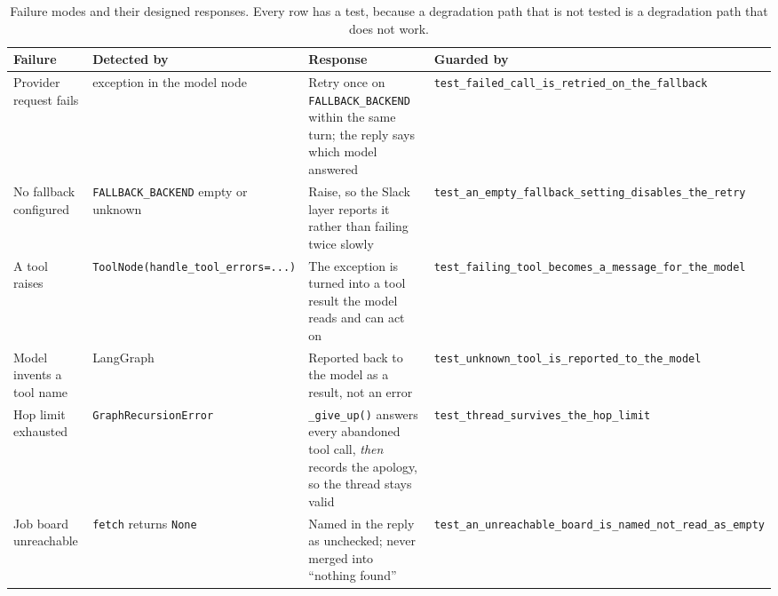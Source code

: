 \documentclass[11pt,a4paper]{article}
\newcommand{\tablefont}{\footnotesize}
\begin{document}
\begin{table}[!ht]
\centering\tablefont
\caption{Failure modes and their designed responses. Every row has a test, because a
degradation path that is not tested is a degradation path that does not work.}
\label{tab:failures}
\begin{tabularx}{\textwidth}{L{3.1cm} L{2.9cm} X L{3.4cm}}
\toprule
\textbf{Failure} & \textbf{Detected by} & \textbf{Response} & \textbf{Guarded by} \\
\midrule
Provider request fails & exception in the model node & Retry once on
  \texttt{FALLBACK\_\allowbreak{}BACKEND} within the same turn; the reply says which model answered &
  \texttt{test\_\allowbreak{}failed\_\allowbreak{}call\_\allowbreak{}is\_\allowbreak{}retried\_\allowbreak{}on\_\allowbreak{}the\_\allowbreak{}fallback} \\
No fallback configured & \texttt{FALLBACK\_\allowbreak{}BACKEND} empty or unknown & Raise, so the Slack
  layer reports it rather than failing twice slowly &
  \texttt{test\_\allowbreak{}an\_\allowbreak{}empty\_\allowbreak{}fallback\_\allowbreak{}setting\_\allowbreak{}disables\_\allowbreak{}the\_\allowbreak{}retry} \\
A tool raises & \texttt{ToolNode(handle\_\allowbreak{}tool\_\allowbreak{}errors=...)} & The exception is turned into a
  tool result the model reads and can act on &
  \texttt{test\_\allowbreak{}failing\_\allowbreak{}tool\_\allowbreak{}becomes\_\allowbreak{}a\_\allowbreak{}message\_\allowbreak{}for\_\allowbreak{}the\_\allowbreak{}model} \\
Model invents a tool name & LangGraph & Reported back to the model as a result, not an error &
  \texttt{test\_\allowbreak{}unknown\_\allowbreak{}tool\_\allowbreak{}is\_\allowbreak{}reported\_\allowbreak{}to\_\allowbreak{}the\_\allowbreak{}model} \\
Hop limit exhausted & \texttt{GraphRecursionError} & \texttt{\_\allowbreak{}give\_\allowbreak{}up()} answers every
  abandoned tool call, \emph{then} records the apology, so the thread stays valid &
  \texttt{test\_\allowbreak{}thread\_\allowbreak{}survives\_\allowbreak{}the\_\allowbreak{}hop\_\allowbreak{}limit} \\
Job board unreachable & \texttt{fetch} returns \texttt{None} & Named in the reply as
  unchecked; never merged into ``nothing found'' &
  \texttt{test\_\allowbreak{}an\_\allowbreak{}unreachable\_\allowbreak{}board\_\allowbreak{}is\_\allowbreak{}named\_\allowbreak{}not\_\allowbreak{}read\_\allowbreak{}as\_\allowbreak{}empty} \\

\end{tabularx}
\end{table}
\end{document}
